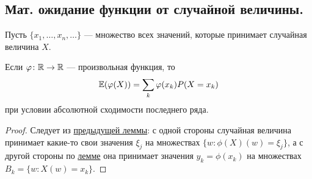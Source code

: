\subsection{Мат. ожидание функции от случайной величины.}
Пусть $\{x_1, \ldots, x_n, \ldots\}$ --- множество всех значений, которые принимает случайная величина $X$.
\begin{theorem}
    Если $\varphi \colon \mathbb{R} \to \mathbb{R}$ --- произвольная функция, то
    \[
        \mathbb{E}(\varphi(X)) = \sum\limits_{k} \varphi(x_k) P(X = x_k)
    \]
    при условии абсолютной сходимости последнего ряда.
\end{theorem}
\begin{proof}
    Следует из \hyperref[lemma_2.1]{предыдущей леммы}: с одной стороны случайная величина
    принимает какие-то свои значения $\xi_j$ на множествах $\{w \colon \phi(X) (w) = \xi_j\}$,
    а с другой стороны по \hyperref[lemma_2.1]{лемме} она принимает значения
    $y_k = \phi(x_k)$ на множествах $B_k = \{w \colon X(w) = x_k\}$.
\end{proof}

